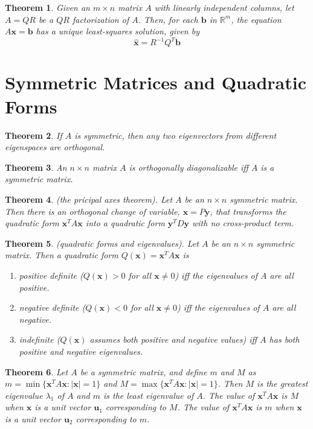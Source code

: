 \documentclass{article}
\theoremstyle{plain}
\newtheorem{thm}{Theorem}[section]
\theoremstyle{definition}
\theoremstyle{remark}
\begin{document}
\begin{thm}
    Given an \(m\times n\) matrix \(A\) with linearly independent columns, let \(A=QR\) be a \(QR\) factorization of \(A\). Then, for each \(\textbf{b}\) in \(\mathbb{R}^m\), the equation \(A\textbf{x}=\textbf{b}\) has a unique least-squares solution, given by \[\hat{\textbf{x}}=R^{-1}Q^T\textbf{b}\]
\end{thm}

\section{Symmetric Matrices and Quadratic Forms}

\begin{thm}
    If \(A\) is symmetric, then any two eigenvectors from different eigenspaces are orthogonal.
\end{thm}

\begin{thm}
    An \(n\times n\) matrix \(A\) is orthogonally diagonalizable iff \(A\) is a symmetric matrix.
\end{thm}

\begin{thm} (the pricipal axes theorem).
    Let \(A\) be an \(n\times n\) symmetric matrix. Then there is an orthogonal change of variable, \(\textbf{x}=P\textbf{y}\), that transforms the quadratic form \(\textbf{x}^TA\textbf{x}\) into a quadratic form \(\textbf{y}^TD\textbf{y}\) with no cross-product term.
\end{thm}

\begin{thm} (quadratic forms and eigenvalues).
    Let \(A\) be an \(n\times n\) symmetric matrix. Then a quadratic form \(Q(\textbf{x})=\textbf{x}^TA\textbf{x}\) is
    \begin{enumerate}
        \item[a.] positive definite (\(Q(\textbf{x})>0\) for all \(\textbf{x}\neq0\)) iff the eigenvalues of \(A\) are all positive.
        \item[b.] negative definite (\(Q(\textbf{x})<0\) for all \(\textbf{x}\neq0\)) iff the eigenvalues of \(A\) are all negative.
        \item[c.] indefinite (\(Q(\textbf{x})\) assumes both positive and negative values) iff \(A\) has both positive and negative eigenvalues.
    \end{enumerate}
\end{thm}

\begin{thm}
    Let \(A\) be a symmetric matrix, and define \(m\) and \(M\) as \(m=\min\{\textbf{x}^TA\textbf{x}:|\textbf{x}|=1\}\) and \(M=\max\{\textbf{x}^TA\textbf{x}:|\textbf{x}|=1\}\). Then \(M\) is the greatest eigenvalue \(\lambda_1\) of \(A\) and \(m\) is the least eigenvalue of \(A\). The value of \(\textbf{x}^TA\textbf{x}\) is \(M\) when \(\textbf{x}\) is a unit vector \(\textbf{u}_1\) corresponding to \(M\). The value of \(\textbf{x}^TA\textbf{x}\) is \(m\) when \(\textbf{x}\) is a unit vector \(\textbf{u}_2\) corresponding to \(m\).
\end{thm}
\end{document}
